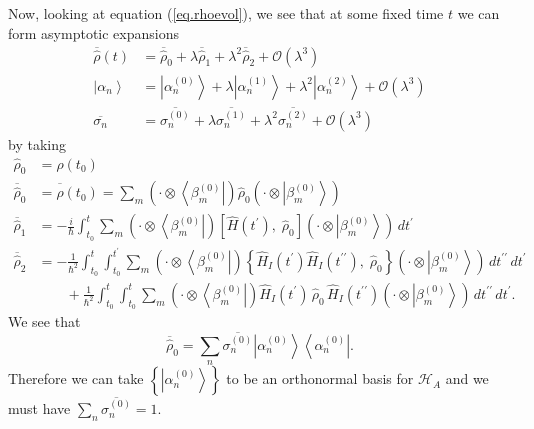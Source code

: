 \documentclass[11pt]{article}
\newcommand{\Od}[1]{\mathcal{O}{\left(#1\right)}}
\newcommand{\bra}[1]{\left\langle#1\right|}
\newcommand{\ket}[1]{\left|#1\right\rangle}
\newcommand{\hilb}{\mathcal{H}}
\newcommand{\op}[1]{\hat{#1}}
\theoremstyle{theorem}
\theoremstyle{remark}
\theoremstyle{step}
\theoremstyle{gap}
\begin{document}
Now, looking at equation (\ref{eq.rhoevol}), we see that at some fixed time \(t\) we can form asymptotic expansions
\begin{align*}
\overline{\op{\rho}}(t) &= \overline{\op{\rho}}_0 + \lambda \overline{\op{\rho}}_1 + \lambda^2 \overline{\op{\rho}}_2 + \Od{\lambda^3} \\
\ket{\alpha_n} &= \ket{\alpha_n^{(0)}} + \lambda \ket{\alpha_n^{(1)}} + \lambda^2 \ket{\alpha_n^{(2)}} + \Od{\lambda^3} \\
\overline{\sigma_n} &= \overline{\sigma_n^{(0)}} + \lambda \overline{\sigma_n^{(1)}} + \lambda^2 \overline{\sigma_n^{(2)}} + \Od{\lambda^3}
\end{align*}
by taking
\begin{align}
\nonumber\op{\rho}_0 &= \op{\rho}\left(t_0\right) \\
\nonumber\overline{\op{\rho}}_0 &= \overline{\op{\rho}}\left(t_0\right) =  \sum_m \left(\cdot\otimes\bra{\beta_m^{(0)}}\right) \op{\rho}_0 \left(\cdot\otimes\ket{\beta_m^{(0)}}\right) \\
\label{eq.rho1red}\overline{\op{\rho}}_1 &= -\frac{i}{\hbar} \int_{t_0}^t \sum_m \left(\cdot\otimes\bra{\beta_m^{(0)}}\right) \left[\op{H}(t^\prime),\; \op{\rho}_0 \right]\left(\cdot\otimes\ket{\beta_m^{(0)}}\right) \,dt^\prime\\
\label{eq.rho2red}\overline{\op{\rho}}_2 &= - \frac{1}{\hbar^2} \int_{t_0}^t \int_{t_0}^{t^\prime} \sum_m \left(\cdot\otimes\bra{\beta_m^{(0)}}\right) \left\{ \op{H}_I (t^\prime) \op{H}_I(t^{\prime\prime}),\; \op{\rho}_0 \right\}\left(\cdot\otimes\ket{\beta_m^{(0)}}\right)\,dt^{\prime\prime}\,dt^\prime \\
\nonumber&\hspace{2em}+ \frac{1}{\hbar^2} \int_{t_0}^t \int_{t_0}^{t} \sum_m \left(\cdot\otimes\bra{\beta_m^{(0)}}\right) \op{H}_I (t^\prime) \,\op{\rho}_0\, \op{H}_I (t^{\prime\prime})\left(\cdot\otimes\ket{\beta_m^{(0)}}\right)\,dt^{\prime\prime}\,dt^\prime.
\end{align}
We see that
\begin{equation}\label{eq.rho0red}
\overline{\op{\rho}}_0 = \sum_n \overline{\sigma_{n}^{(0)}} \ket{\alpha_n^{(0)}}\bra{\alpha_n^{(0)}}.
\end{equation}
Therefore we can take \(\left\{\ket{\alpha_n^{(0)}}\right\}\) to be an orthonormal basis for \(\hilb_A\) and we must have \(\sum_n \overline{\sigma_n^{(0)}} = 1\).
\end{document}
